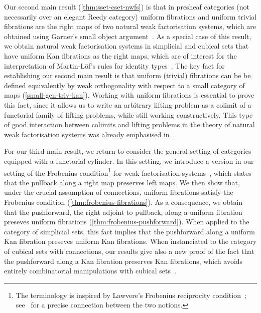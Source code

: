 \documentclass[reqno,10pt,a4paper,oneside]{amsart}
\begin{document}
Our second main result (\cref{thm:sset-cset-nwfs}) is that in presheaf categories (not necessarily over an elegant Reedy category) uniform fibrations and uniform trivial fibrations are the right maps of two natural weak factorisation systems, which are obtained using Garner's small object argument~\cite{garner:small-object-argument}.
As a special case of this result, we obtain natural weak factorisation systems in simplicial and cubical sets that have uniform Kan fibrations as the right maps, which are of interest for the interpretation of Martin-L\"of's rules for identity types~\cite{warren:thesis,awodey-warren:homotopy-idtype,garner:topological-simplicial}.
The key fact for establishing our second main result is that uniform (trivial) fibrations can be be defined equivalently by weak orthogonality with respect to a small category of maps (\cref{small-gen-triv-kan}).
Working with uniform fibrations is essential to prove this fact, since it allows us to write an arbitrary lifting problem as a colimit of a functorial family of lifting problems, while still working constructively.
This type of good interaction between colimits and lifting problems in the theory of natural weak factorisation systems was already emphasised in~\cite{riehl-cat-homotopy}.

For our third main result, we return to consider the general setting of categories equipped with a functorial cylinder.
In this setting, we introduce a version in our setting of the Frobenius condition\footnote{The terminology is inspired by Lawvere's Frobenius reciprocity condition~\cite{lawvere-equality}; see~\cite{clementino:frobenius} for a precise connection between the two notions.} for weak factorisation systems~\cite{garner:types-omega-groupoids}, which states that the pullback along a right map preserves left maps.
We then show that, under the crucial assumption of connections, uniform fibrations satisfy the Frobenius condition (\cref{thm:frobenius-fibrations}).
As a consequence, we obtain that the pushforward, \ie the right adjoint to pullback, along a uniform fibration preseves uniform fibrations (\cref{thm:frobenius-pushforward}).
When applied to the category of simplicial sets, this fact implies that the pushforward along a uniform Kan fibration preseves uniform Kan fibrations.
When instanciated to the category of cubical sets with connections, our results give also a new proof of the fact that the pushforward along a Kan fibration preserves Kan fibrations, which avoids entirely combinatorial manipulations with cubical sets~\cite{coquand-variation}.
\end{document}
